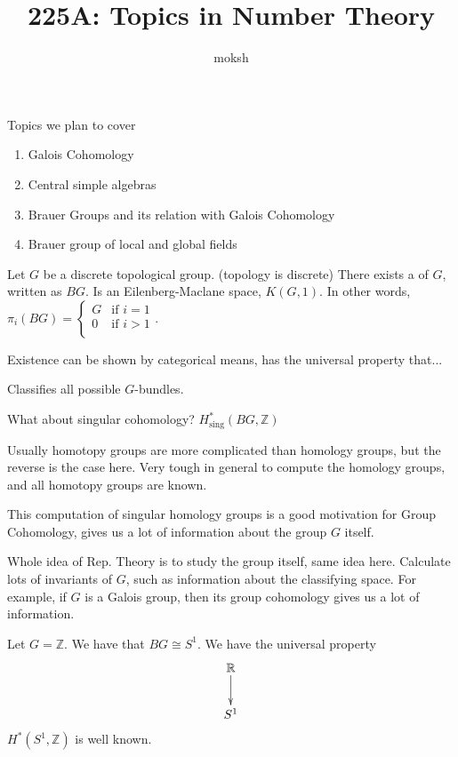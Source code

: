 \documentclass[12pt]{scrartcl}
\title{225A: Topics in Number Theory}
\author{moksh}
\begin{document}
\maketitle
\tableofcontents

\newpage

Topics we plan to cover

\begin{enumerate}
	\item Galois Cohomology
	\item Central simple algebras
	\item Brauer Groups and its relation with Galois Cohomology
	\item Brauer group of local and global fields
\end{enumerate}


\begin{motivation}
Let $G$ be a discrete topological group. (topology is discrete)
There exists a  of $G$, written as $BG$.
Is an Eilenberg-Maclane space, $K(G, 1)$.
In other words, 
$	\pi_i(BG) = 
\begin{cases}
	G & \textrm{if } i=1  \\
	0 & \textrm{if } i>1  \\

\end{cases}
$.

Existence can be shown by categorical means, has the universal property that... 

Classifies all possible $G$-bundles.

What about singular cohomology? $H_{\textrm{sing}}^{*} (BG, \mathbb{Z})$ 

Usually homotopy groups are more complicated than homology groups, but the reverse is the case here.
Very tough in general to compute the homology groups, and all homotopy groups are known.
\end{motivation}
This computation of singular homology groups is a good motivation for Group Cohomology, gives us a lot of information about the group $G$ itself.
	
Whole idea of Rep. Theory is to study the group itself, same idea here. 
Calculate lots of invariants of $G$, such as information about the classifying space.
For example, if $G$ is a Galois group, then its group cohomology gives us a lot of information.

\begin{example}
Let $G = \mathbb{Z}$.
We have that $BG \cong S^1$.
We have the universal property
\[
\begin{array}{c}
	\xymatrix{
		\mathbb{R}\ar[d] \\
S^1
	}
\end{array}
\]
$H^{*}(S^1, \mathbb{Z})$ is well known.
\end{example}
\end{document}
